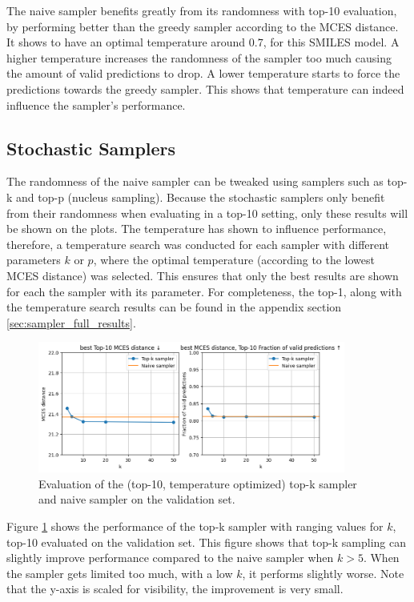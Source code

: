 The naive sampler benefits greatly from its randomness with top-10 evaluation, by performing better than the greedy sampler according to the MCES distance.
It shows to have an optimal temperature around $0.7$, for this SMILES model.
A higher temperature increases the randomness of the sampler too much causing the amount of valid predictions to drop.
A lower temperature starts to force the predictions towards the greedy sampler.
This shows that temperature can indeed influence the sampler's performance.

\subsection{Stochastic Samplers}

The randomness of the naive sampler can be tweaked using samplers such as top-k and top-p (nucleus sampling).
Because the stochastic samplers only benefit from their randomness when evaluating in a top-10 setting, only these results will be shown on the plots.
The temperature has shown to influence performance, therefore, a temperature search was conducted for each sampler with different parameters $k$ or $p$, where the optimal temperature (according to the lowest MCES distance) was selected.
This ensures that only the best results are shown for each the sampler with its parameter.
For completeness, the top-1, along with the temperature search results can be found in the appendix section \ref{sec:sampler_full_results}.

\begin{figure}[h]
    \centering
    \includegraphics[width=0.9\textwidth]{figures/results/samplers/top-k.png}
    \caption{Evaluation of the (top-10, temperature optimized) top-k sampler and naive sampler on the validation set.}
    \label{fig:top-k}
\end{figure}

Figure \ref{fig:top-k} shows the performance of the top-k sampler with ranging values for $k$, top-10 evaluated on the validation set.
This figure shows that top-k sampling can slightly improve performance compared to the naive sampler when $k > 5$.
When the sampler gets limited too much, with a low $k$, it performs slightly worse. 
Note that the y-axis is scaled for visibility, the improvement is very small.

